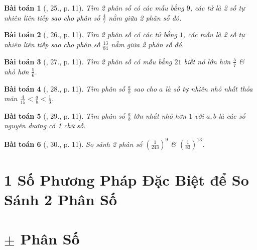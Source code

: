 \documentclass{article}
\newtheorem{baitoan}{Bài toán}
\begin{document}
\begin{baitoan}[\cite{Binh_Toan_6_tap_2}, 25., p. 11]
	Tìm 2 phân số có các mẫu bằng $9$, các tử là 2 số tự nhiên liên tiếp sao cho phân số $\frac{4}{7}$ nằm giữa 2 phân số đó.
\end{baitoan}

\begin{baitoan}[\cite{Binh_Toan_6_tap_2}, 26., p. 11]
	Tìm 2 phân số có các tử bằng $1$, các mẫu là 2 số tự nhiên liên tiếp sao cho phân số $\frac{13}{84}$ nằm giữa 2 phân số đó.
\end{baitoan}

\begin{baitoan}[\cite{Binh_Toan_6_tap_2}, 27., p. 11]
	Tìm 2 phân số có mẫu bằng $21$ biết nó lớn hơn $\frac{5}{7}$ \& nhỏ hơn $\frac{5}{6}$.
\end{baitoan}

\begin{baitoan}[\cite{Binh_Toan_6_tap_2}, 28., p. 11]
	Tìm phân số $\frac{a}{b}$ sao cho $a$ là số tự nhiên nhỏ nhất thỏa mãn $\frac{4}{15} < \frac{a}{b} < \frac{1}{3}$.
\end{baitoan}

\begin{baitoan}[\cite{Binh_Toan_6_tap_2}, 29., p. 11]
	Tìm phân số $\frac{a}{b}$ lớn nhất nhỏ hơn $1$ với $a,b$ là các số nguyên dương có 1 chữ số.
\end{baitoan}

\begin{baitoan}[\cite{Binh_Toan_6_tap_2}, 30., p. 11]
	So sánh 2 phân số $\left(\frac{1}{243}\right)^9$ \& $\left(\frac{1}{83}\right)^{13}$.
\end{baitoan}


\section{1 Số Phương Pháp Đặc Biệt để So Sánh 2 Phân Số}


\section{$\pm$ Phân Số}

\end{document}
